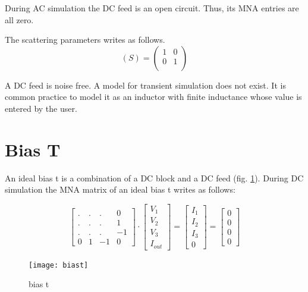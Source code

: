 During AC simulation the DC feed is an open circuit. Thus, its MNA
entries are all zero.

\addvspace{12pt}

The scattering parameters writes as follows.
\begin{equation}
(S) =
\begin{pmatrix}
1 & 0\\
0 & 1\\
\end{pmatrix}
\end{equation}

A DC feed is noise free. A model for transient simulation does not
exist. It is common practice to model it as an inductor with finite
inductance whose value is entered by the user.


\section{Bias T}

An ideal bias t is a combination of a DC block and a DC feed
(fig. \ref{fig:biast}). During DC simulation the MNA matrix
of an ideal bias t writes as follows:

\begin{equation}
\begin{bmatrix}
 . & . & .  &  0\\
 . & . & .  &  1\\
 . & . & .  & -1\\
 0 & 1 & -1 &  0
\end{bmatrix}
\cdot
\begin{bmatrix}
V_{1}\\
V_{2}\\
V_{3}\\
I_{out}
\end{bmatrix}
=
\begin{bmatrix}
I_{1}\\
I_{2}\\
I_{3}\\
0
\end{bmatrix}
=
\begin{bmatrix}
0\\
0\\
0\\
0
\end{bmatrix}
\end{equation}

\begin{figure}[ht]
\begin{center}
\texttt{[image: biast]}
\end{center}
\caption{bias t}
\label{fig:biast}
\end{figure}
\FloatBarrier

